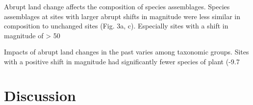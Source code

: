 Abrupt land change affects the composition of species assemblages. Species assemblages at sites with larger abrupt shifts in magnitude were less similar in composition to unchanged sites (Fig. 3a, c). Especially sites with a shift in magnitude of > 50%

Impacts of abrupt land changes in the past varies among taxonomic groups. Sites with a positive shift in magnitude had significantly fewer species of plant (-9.7%

\section{Discussion}

\clearpage
%

%  
